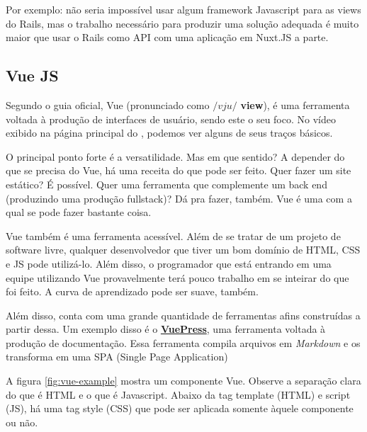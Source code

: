 Por exemplo: não seria impossível usar algum framework Javascript para as views do Rails, mas
o trabalho necessário para produzir uma solução adequada é muito maior que usar o Rails como
API com uma aplicação em Nuxt.JS a parte.

\subsection{Vue JS}\label{subsec:vue-js}

Segundo o guia oficial, Vue (pronunciado como $/vju/$ \dir \textbf{view}), é uma ferramenta
voltada à produção de interfaces de usuário, sendo este o seu foco. No vídeo exibido na página
principal do , podemos ver alguns de seus traços básicos.

O principal ponto forte é a versatilidade. Mas em que sentido? A depender do que se precisa do
Vue, há uma receita do que pode ser feito. Quer fazer um site estático? É possível. Quer uma 
ferramenta que complemente um back end (produzindo uma produção fullstack)? Dá pra fazer, também. 
Vue é uma  com a qual se pode fazer bastante coisa.

Vue também é uma ferramenta acessível. Além de se tratar de um projeto de software livre, qualquer
desenvolvedor que tiver um bom domínio de HTML, CSS e JS pode utilizá-lo. Além disso, o programador
que está entrando em uma equipe utilizando Vue provavelmente terá pouco trabalho em se inteirar do
que foi feito. A curva de aprendizado pode ser suave, também.

Além disso, conta com uma grande quantidade de ferramentas afins construídas a partir dessa. Um
exemplo disso é o \href{https://www.youtube.com/watch?v=lIv1ItUzktc}{\textbf{VuePress}}, uma
ferramenta voltada à produção de documentação. Essa ferramenta compila arquivos em \emph{Markdown}
e os transforma em uma SPA (Single Page Application)

A figura \ref{fig:vue-example} mostra um componente Vue. Observe a separação clara do que é HTML e
o que é Javascript. Abaixo da tag template (HTML) e script (JS), há uma tag style (CSS) que pode ser
aplicada somente àquele componente ou não.

